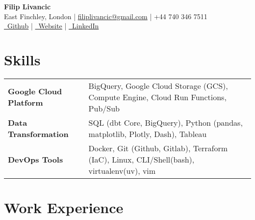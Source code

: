 \documentclass[a4paper, 10pt]{article}
\date{}
\begin{document}
\vspace*{-7.0mm}

\begin{center}
    {\LARGE \textbf{Filip Livancic}} \\[1mm]
    \vspace{-0mm}
    East Finchley, London \quad | \quad 
    \href{mailto:filiplivancic@gmail.com}{filiplivancic@gmail.com} \quad | \quad 
    +44 740 346 7511 \\
    \vspace{1mm}
    \href{https://github.com/Filpill/}{\faGithub\ Github} \quad | \quad 
    \href{https://filiplivancic.com/}{\faGlobe\ Website} \quad | \quad 
    \href{https://linkedin.com/in/filip-livancic/}{\faLinkedinSquare\ LinkedIn}
\end{center}\vspace{-6.5mm}

\section*{Skills}
\vspace{-7.5mm}

\begin{table}[h!]
\centering
\renewcommand{\arraystretch}{1.2}
\begin{tabular}{@{} l p{14.0cm} @{}}
  \textbf{Google Cloud Platform} & BigQuery, Google Cloud Storage (GCS), Compute Engine, Cloud Run Functions, Pub/Sub\\
  \textbf{Data Transformation} & SQL (dbt Core, BigQuery), Python (pandas, matplotlib, Plotly, Dash), Tableau\\
  \textbf{DevOps Tools} & Docker, Git (Github, Gitlab), Terraform (IaC), Linux, CLI/Shell(bash), virtualenv(uv), vim\\
\end{tabular}
\end{table}

\vspace{-7.5mm}

\section*{Work Experience}
\vspace{-2.5mm}
\end{document}
